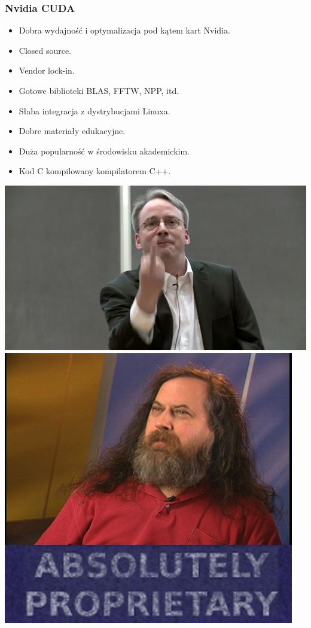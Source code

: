 \documentclass[dvipsnames,table]{beamer}
\begin{document}
\begin{frame}
	\frametitle{Nvidia CUDA}
\begin{itemize}
	\item Dobra wydajność i optymalizacja pod kątem kart Nvidia.
	\item Closed source.
	\item Vendor lock-in.
	\item Gotowe biblioteki BLAS, FFTW, NPP, itd.
	\item Słaba integracja z dystrybucjami Linuxa.
	\item Dobre materiały edukacyjne.
	\item Duża popularność w środowisku akademickim.
	\item Kod C kompilowany kompilatorem C++. \Annoey
\end{itemize}
\includegraphics[scale=0.25]{img-torvalds.png}
\includegraphics[scale=0.19]{img-stallman.jpg}

\end{frame}
\end{document}
